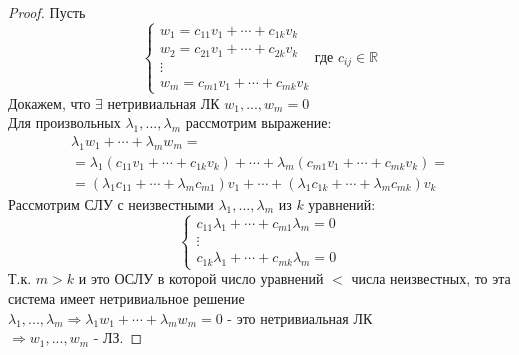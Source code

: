 \documentclass[a4paper, 12pt]{article}
\newcommand{\R}{\mathbb R}
\theoremstyle{definition}
\begin{document}
  \begin{proof}
    Пусть 
    $$\begin{cases}
      w_1 = c_{11}v_1+\cdots+c_{1k}v_k \\
      w_2 = c_{21}v_1+\cdots+c_{2k}v_k \\
      \vdots \\
      w_m = c_{m1}v_1+\cdots+c_{mk}v_k
    \end{cases}
    \text{где } c_{ij} \in \R
    $$
    Докажем, что $\exists$ нетривиальная ЛК $w_1,...,w_m=0$ \\
    Для произвольных $\lambda_1,...,\lambda_m$ рассмотрим выражение: 
    \begin{multline*}
      \lambda_1w_1 +\cdots+\lambda_mw_m = \\ = \lambda_1(c_{11}v_1+\cdots+c_{1k}v_k) + \cdots + \lambda_m(c_{m1}v_1+\cdots+c_{mk}v_k) = \\ = (\lambda_1c_{11}+\cdots+\lambda_mc_{m1})v_1+\cdots+(\lambda_1c_{1k}+\cdots+\lambda_mc_{mk})v_k 
    \end{multline*}
    Рассмотрим СЛУ с неизвестными $\lambda_1,...,\lambda_m$ из $k$ уравнений:
    $$\begin{cases}
      c_{11}\lambda_1+\cdots+c_{m1}\lambda_m=0 \\
      \vdots \\
      c_{1k}\lambda_1+\cdots+c_{mk}\lambda_m=0
    \end{cases}$$ 
    Т.к. $m>k$ и это ОСЛУ в которой число уравнений $<$ числа неизвестных, то эта система имеет нетривиальное решение \\
    $\lambda_1,...,\lambda_m \Longrightarrow \lambda_1w_1+\cdots+\lambda_mw_m = 0$ - это нетривиальная ЛК \\ $\Longrightarrow w_1,...,w_m$ - ЛЗ. 
  \end{proof} 
\end{document}
